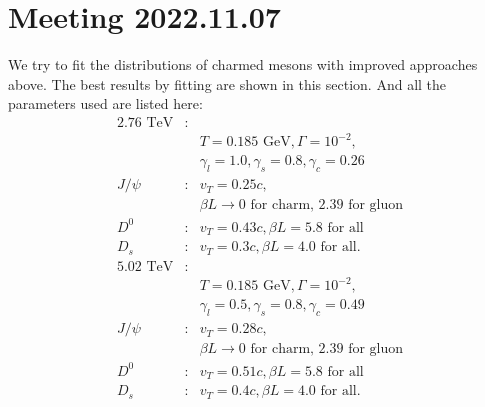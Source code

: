\documentclass[twocolumn,aps,superscriptaddress,nofootinbib,floatfix]{revtex4}
\begin{document}
\section{Meeting 2022.11.07}
We try to fit the distributions of charmed mesons with improved approaches above. The best results by fitting are shown in this section.
And all the parameters used are listed here:
\begin{eqnarray}
	\text{2.76 TeV}&:&  \nonumber \\
	&&T=0.185 \text{ GeV}, \Gamma=10^{-2}, \nonumber \\
	&&\gamma_l=1.0,  \gamma_s=0.8 ,\gamma_c=0.26\nonumber \\
	J/\psi&:& v_T=0.25c,  \\ \nonumber
	&&\beta L\rightarrow \text{0 for charm, 2.39 for gluon}\\
	D^0&:& v_T=0.43c,  \beta L=\text{5.8 for all}\\
	D_s&:& v_T=0.3c,    \beta L=\text{4.0 for all}.\\
	\text{5.02 TeV}&:&  \nonumber \\
	&&T=0.185 \text{ GeV}, \Gamma=10^{-2}, \nonumber \\
	&&\gamma_l=0.5,  \gamma_s=0.8 ,\gamma_c=0.49\nonumber \\
	J/\psi&:& v_T=0.28c,  \\ \nonumber
	&&\beta L\rightarrow \text{0 for charm, 2.39 for gluon}\\
	D^0&:& v_T=0.51c,  \beta L=\text{5.8 for all}\\
	D_s&:& v_T=0.4c,    \beta L=\text{4.0 for all}.
\end{eqnarray}
\end{document}
